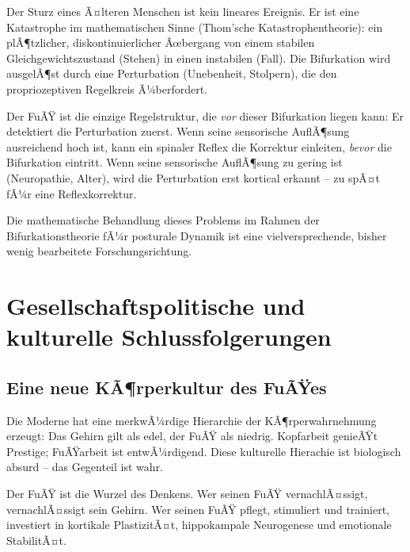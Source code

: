 ﻿\documentclass[12pt,a4paper]{report}
\theoremstyle{plain}
\theoremstyle{definition}
\theoremstyle{remark}
\begin{document}
Der Sturz eines Ã¤lteren Menschen ist kein lineares Ereignis.
Er ist eine Katastrophe im mathematischen Sinne (Thom'sche
Katastrophentheorie): ein plÃ¶tzlicher, diskontinuierlicher
Ãœbergang von einem stabilen Gleichgewichtszustand (Stehen)
in einen instabilen (Fall). Die Bifurkation wird ausgelÃ¶st
durch eine Perturbation (Unebenheit, Stolpern), die den
propriozeptiven Regelkreis Ã¼berfordert.

Der FuÃŸ ist die einzige Regelstruktur, die \emph{vor} dieser
Bifurkation liegen kann: Er detektiert die Perturbation zuerst.
Wenn seine sensorische AuflÃ¶sung ausreichend hoch ist, kann
ein spinaler Reflex die Korrektur einleiten, \emph{bevor} die
Bifurkation eintritt. Wenn seine sensorische AuflÃ¶sung zu gering
ist (Neuropathie, Alter), wird die Perturbation erst kortical
erkannt -- zu spÃ¤t fÃ¼r eine Reflexkorrektur.

Die mathematische Behandlung dieses Problems im Rahmen der
Bifurkationstheorie fÃ¼r posturale Dynamik ist eine
vielversprechende, bisher wenig bearbeitete Forschungsrichtung.

\section{Gesellschaftspolitische und kulturelle Schlussfolgerungen}

\subsection{Eine neue KÃ¶rperkultur des FuÃŸes}

Die Moderne hat eine merkwÃ¼rdige Hierarchie der KÃ¶rperwahrnehmung
erzeugt: Das Gehirn gilt als edel, der FuÃŸ als niedrig. Kopfarbeit
genieÃŸt Prestige; FuÃŸarbeit ist entwÃ¼rdigend. Diese kulturelle
Hierachie ist biologisch absurd -- das Gegenteil ist wahr.

Der FuÃŸ ist die Wurzel des Denkens. Wer seinen FuÃŸ vernachlÃ¤ssigt,
vernachlÃ¤ssigt sein Gehirn. Wer seinen FuÃŸ pflegt, stimuliert
und trainiert, investiert in kortikale PlastizitÃ¤t, hippokampale
Neurogenese und emotionale StabilitÃ¤t.
\end{document}
